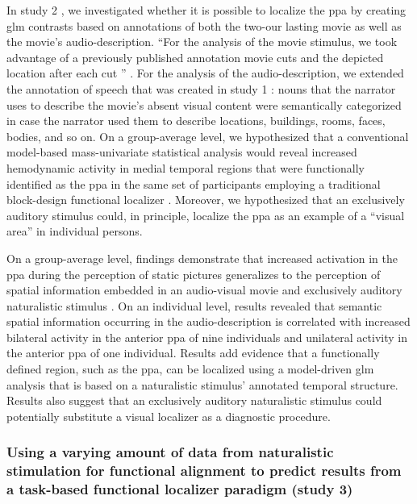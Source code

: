 In study 2 \citep{haeusler2022processing}, we investigated whether it is
possible to localize the \ac{ppa} by creating \ac{glm} contrasts
based on annotations of both the two-our lasting movie as well as the movie's
audio-description.
``For the analysis of the movie stimulus, we took advantage of a previously
published annotation movie cuts and the depicted location after each cut
\citep{haeusler2016cutanno}'' \citep{haeusler2022processing}.
For the analysis of the audio-description, we extended the annotation of speech
that was created in study 1 \citep{haeusler2021speechanno}:
%
nouns that the narrator uses to describe the movie's absent visual content were
semantically categorized in case the narrator used them to describe locations,
buildings, rooms, faces, bodies, and so on.
On a group-average level, we hypothesized that a conventional model-based
mass-univariate statistical analysis would reveal increased hemodynamic activity
in medial temporal regions that were functionally identified as the \ac{ppa} in
the same set of participants employing a traditional block-design functional
localizer \citep{sengupta2016extension}.
Moreover, we hypothesized that an exclusively auditory stimulus could, in
principle, localize the \ac{ppa} as an example of a ``visual area'' in
individual persons.

On a group-average level, findings demonstrate that increased activation in the
\ac{ppa} during the perception of static pictures generalizes to the perception
of spatial information embedded in an audio-visual movie and exclusively
auditory naturalistic stimulus \citep{haeusler2022processing}.
On an individual level, results revealed that semantic spatial information
occurring in the audio-description is correlated with increased bilateral
activity in the anterior \ac{ppa} of nine individuals and unilateral activity in
the anterior \ac{ppa} of one individual.
Results add evidence \citep[cf.][]{bartels2004mapping} that a functionally
defined region, such as the \ac{ppa}, can be localized using a model-driven
\ac{glm} analysis that is based on a naturalistic stimulus' annotated temporal
structure.
Results also suggest that an exclusively auditory naturalistic stimulus could
potentially substitute a visual localizer as a diagnostic procedure.



\subsubsection{Using a varying amount of data from naturalistic stimulation for
functional alignment to predict results from a task-based functional localizer
paradigm (study 3)}

